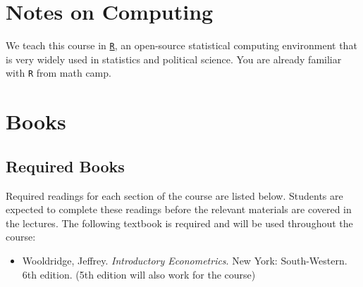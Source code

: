 \documentclass[PS]{syllabus}
\begin{document}
\begin{syllabus}


\section*{Notes on Computing}

We teach this course in \href{http://www.r-project.org/}{{\tt R}}, an open-source statistical computing environment that is very widely used in statistics and political science. You are already familiar with {\tt R} from math camp.

\section*{Books}

\subsection*{Required Books}
Required readings for each section of the course are listed below. Students are expected to complete these readings before the relevant materials are covered in the lectures.
The following textbook is required and will be used throughout the course:
\begin{itemize}	
\item Wooldridge, Jeffrey. \emph{Introductory Econometrics}. New York: South-Western. 6th edition. (5th edition will also work for the course)
\end{itemize}


\end{syllabus}
\end{document}
